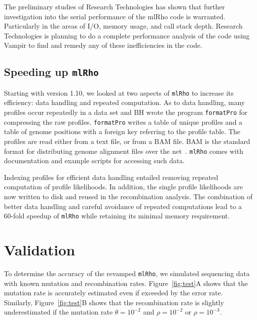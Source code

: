 \documentclass{sig-alternate}
\newcommand{\ty}{\texttt}
\begin{document}
The preliminary studies of Research Technologies has shown that further investigation into the serial
performance of the mlRho code is warranted. Particularly in the areas of I/O, memory usage, and call stack
depth. Research Technologies is planning to do a complete performance analysis of the code using Vampir to
find and remedy any of these inefficiencies in the code. 

\subsection{Speeding up \ty{mlRho}}
Starting with version 1.10, we looked at two aspects of \ty{mlRho} to
increase its efficiency: data handling and repeated
computation. As to data handling, many profiles occur repeatedly in a
data set and BH wrote the program \ty{formatPro} for compressing the raw
profiles. \ty{formatPro} writes a table of unique profiles and a table
of genome positions with a foreign key referring to the profile
table. The profiles are read either from a text file, or from a BAM
file. BAM is the standard format for distributing genome alignment
files over the net~\cite{li09:seq}. \ty{mlRho} comes with documentation and example
scripts for accessing such data.

Indexing profiles for efficient data handling entailed removing repeated
computation of profile likelihoods. In addition, the single profile
likelihoods are now written to disk and reused in the recombination
analysis. The combination of better data handling and careful
avoidance of repeated computations lead to a 60-fold speedup of
\ty{mlRho} while retaining its minimal memory requirement.

\section{Validation}
To determine the accuracy of the revamped \ty{mlRho}, we simulated
sequencing data with known mutation and recombination
rates. Figure~\ref{fig:test}A shows that the mutation rate is
accurately estimated even if exceeded by the error
rate. Similarly, Figure~\ref{fig:test}B shows that the recombination rate is
slightly underestimated if the mutation rate $\theta=10^{-2}$ and
$\rho=10^{-2}$ or $\rho=10^{-3}$.
\end{document}
